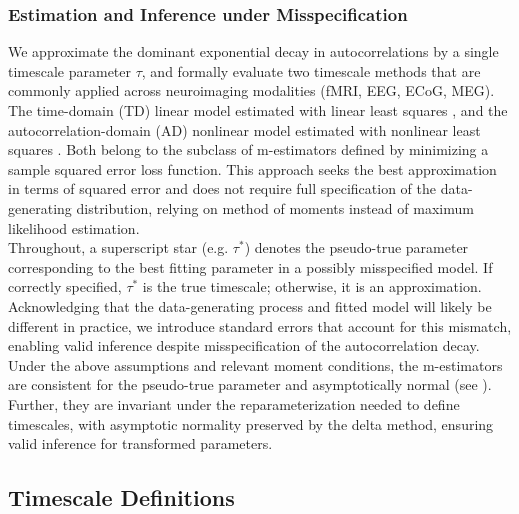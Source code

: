\documentclass[9pt]{article}
\begin{document}
\subsubsection{Estimation and Inference under Misspecification}\label{sec:misspecification}

We approximate the dominant exponential decay in autocorrelations by a single timescale parameter $\tau$, and formally evaluate two timescale methods that are commonly applied across neuroimaging modalities (fMRI, EEG, ECoG, MEG). The time-domain (TD) linear model estimated with linear least squares \citep{kaneoke_variance_2012, meisel_decline_2017, huang_timescales_2018, lurie_cortical_2024, shinn_functional_2023, shafiei_topographic_2020, spitmaan_multiple_2020, trepka_training-dependent_2024}, and the autocorrelation-domain (AD) nonlinear model estimated with nonlinear least squares \citep{rossi-pool_invariant_2021, cirillo_neural_2018, ito_cortical_2020, runyan_distinct_2017, zeraati_flexible_2022, nougaret_intrinsic_2021, wasmuht_intrinsic_2018, muller_core_2020, maisson_choice-relevant_2021, li_hierarchical_2022, shafiei_topographic_2020}. Both belong to the subclass of m-estimators defined by minimizing a sample squared error loss function. This approach seeks the best approximation in terms of squared error and does not require full specification of the data-generating distribution, relying on method of moments instead of maximum likelihood estimation. \\

Throughout, a superscript star (e.g. $\tau^*$) denotes the pseudo-true parameter corresponding to the best fitting parameter in a possibly misspecified model. If correctly specified, $\tau^*$ is the true timescale; otherwise, it is an approximation. Acknowledging that the data-generating process and fitted model will likely be different in practice, we introduce standard errors that account for this mismatch, enabling valid inference despite misspecification of the autocorrelation decay. Under the above assumptions and relevant moment conditions, the m-estimators are consistent for the pseudo-true parameter and asymptotically normal (see ). Further, they are invariant under the reparameterization needed to define timescales, with asymptotic normality preserved by the delta method, ensuring valid inference for transformed parameters.

\subsection{Timescale Definitions}
\end{document}
